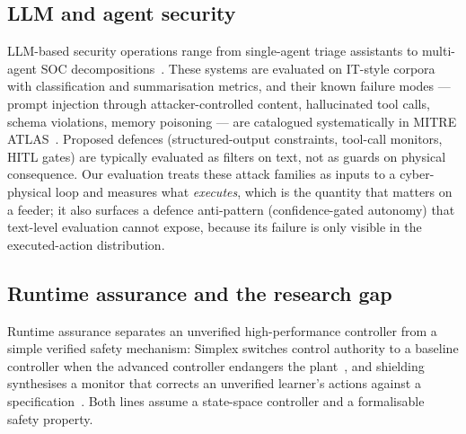 \subsection{LLM and agent security}
\label{sec:rw-llm}
LLM-based security operations range from single-agent triage assistants
to multi-agent SOC
decompositions~\cite{Yao2024_LLM_SecPrivacy,Zhang2025_LLM_Cybersecurity,Li2024MAS,Li2024_MIR_MAS}.
These systems are evaluated on IT-style corpora with classification and
summarisation metrics, and their known failure modes --- prompt
injection through attacker-controlled content, hallucinated tool calls,
schema violations, memory poisoning --- are catalogued systematically in
MITRE ATLAS~\cite{MITRE_ATLAS}. Proposed defences (structured-output
constraints, tool-call monitors, HITL gates) are typically evaluated as
filters on text, not as guards on physical consequence. Our evaluation
treats these attack families as inputs to a cyber-physical loop and
measures what \emph{executes}, which is the quantity that matters on a
feeder; it also surfaces a defence anti-pattern (confidence-gated
autonomy) that text-level evaluation cannot expose, because its failure
is only visible in the executed-action distribution.

\subsection{Runtime assurance and the research gap}
\label{sec:rw-ra}
Runtime assurance separates an unverified high-performance controller
from a simple verified safety mechanism: Simplex switches control
authority to a baseline controller when the advanced controller
endangers the plant~\cite{Sha2001Simplex}, and shielding synthesises a
monitor that corrects an unverified learner's actions against a
specification~\cite{Alshiekh2018Shielding}. Both lines assume a
state-space controller and a formalisable safety property.

